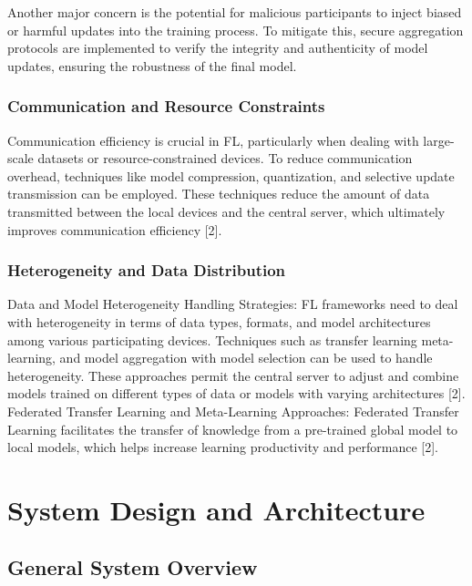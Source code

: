 Another major concern is the potential for malicious participants to inject biased or harmful updates into the training process. To mitigate this, secure aggregation protocols are implemented to verify the integrity and authenticity of model updates, ensuring the robustness of the final model.


\subsubsection{Communication and Resource Constraints}

Communication efficiency is crucial in FL, particularly when dealing with large-scale datasets or resource-constrained devices. To reduce communication overhead, techniques like model compression, quantization, and selective update transmission can be employed. These techniques reduce the amount of data transmitted between the local devices and the central server, which ultimately improves communication efficiency [2].


\subsubsection{Heterogeneity and Data Distribution}
Data and Model Heterogeneity Handling Strategies:
FL frameworks need to deal with heterogeneity in terms of data types, formats, and model architectures among various participating devices. Techniques such as transfer learning meta-learning, and model aggregation with model selection can be used to handle heterogeneity. These approaches permit the central server to adjust and combine models trained on different types of data or models with varying architectures [2].
Federated Transfer Learning and Meta-Learning Approaches:
Federated Transfer Learning facilitates the transfer of knowledge from a pre-trained global model to local models, which helps increase learning productivity and performance [2].



\section{System Design and Architecture}
\label{sec:system_design_and_architecture}

\subsection{General System Overview}
\label{ssec:general_system_overview}

